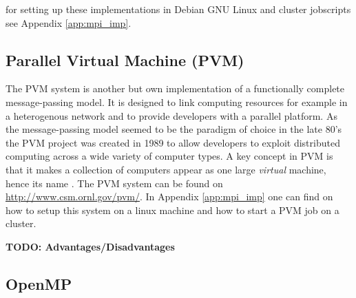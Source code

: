 for setting up these implementations in Debian GNU Linux and cluster
jobscripts see Appendix \ref{app:mpi_imp}. 

\subsection{Parallel Virtual Machine (PVM)}
\label{sec:PVM}

The PVM system is another but own implementation of a functionally
complete message-passing model. It is designed to link computing
resources for example in a heterogenous network and to provide
developers with a parallel platform. As the message-passing model
seemed to be the paradigm of choice in the late 80's the PVM project
was created in 1989 to allow developers to exploit distributed
computing across a wide variety of computer types. A key concept in
PVM is that it makes a collection of computers appear as one large
\textit{virtual} machine, hence its name \cite{geist94pvm}. The PVM
system can be found on \url{http://www.csm.ornl.gov/pvm/}. In Appendix
\ref{app:mpi_imp} one can find on how to setup this system on a linux
machine and how to start a PVM job on a cluster.

\textbf{TODO: Advantages/Disadvantages}


\subsection{OpenMP}
\label{sec:OpenMP}


